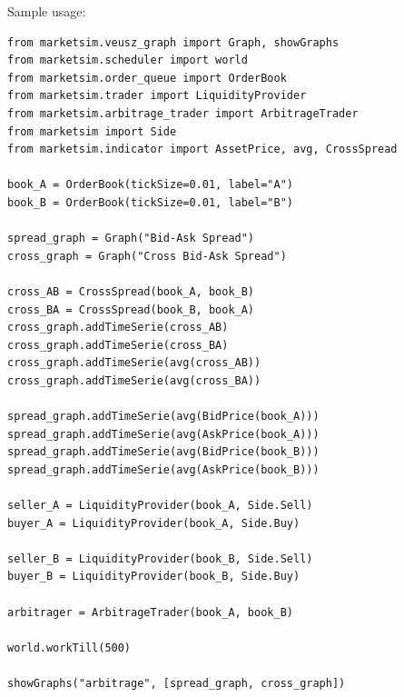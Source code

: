 \documentclass[a4paper,11pt]{article}
\begin{document}
Sample usage:

\begin{verbatim}
from marketsim.veusz_graph import Graph, showGraphs
from marketsim.scheduler import world
from marketsim.order_queue import OrderBook
from marketsim.trader import LiquidityProvider
from marketsim.arbitrage_trader import ArbitrageTrader
from marketsim import Side
from marketsim.indicator import AssetPrice, avg, CrossSpread

book_A = OrderBook(tickSize=0.01, label="A")
book_B = OrderBook(tickSize=0.01, label="B")

spread_graph = Graph("Bid-Ask Spread")
cross_graph = Graph("Cross Bid-Ask Spread")

cross_AB = CrossSpread(book_A, book_B)
cross_BA = CrossSpread(book_B, book_A)
cross_graph.addTimeSerie(cross_AB)
cross_graph.addTimeSerie(cross_BA)
cross_graph.addTimeSerie(avg(cross_AB))
cross_graph.addTimeSerie(avg(cross_BA))

spread_graph.addTimeSerie(avg(BidPrice(book_A)))
spread_graph.addTimeSerie(avg(AskPrice(book_A)))
spread_graph.addTimeSerie(avg(BidPrice(book_B)))
spread_graph.addTimeSerie(avg(AskPrice(book_B)))

seller_A = LiquidityProvider(book_A, Side.Sell)
buyer_A = LiquidityProvider(book_A, Side.Buy)

seller_B = LiquidityProvider(book_B, Side.Sell)
buyer_B = LiquidityProvider(book_B, Side.Buy)

arbitrager = ArbitrageTrader(book_A, book_B)

world.workTill(500)

showGraphs("arbitrage", [spread_graph, cross_graph])
\end{verbatim}
\end{document}
